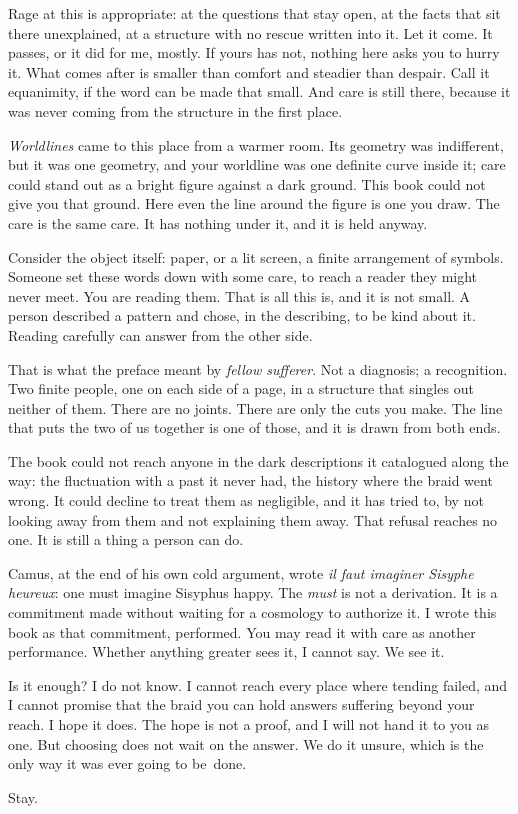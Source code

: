 Rage at this is appropriate: at the questions that stay open, at the facts that sit there unexplained, at a structure with no rescue written into it. Let it come. It passes, or it did for me, mostly. If yours has not, nothing here asks you to hurry it. What comes after is smaller than comfort and steadier than despair. Call it equanimity, if the word can be made that small. And care is still there, because it was never coming from the structure in the first place.

\textit{Worldlines} came to this place from a warmer room. Its geometry was indifferent, but it was one geometry, and your worldline was one definite curve inside it; care could stand out as a bright figure against a dark ground. This book could not give you that ground. Here even the line around the figure is one you draw. The care is the same care. It has nothing under it, and it is held anyway.

Consider the object itself: paper, or a lit screen, a finite arrangement of symbols. Someone set these words down with some care, to reach a reader they might never meet. You are reading them. That is all this is, and it is not small. A person described a pattern and chose, in the describing, to be kind about it. Reading carefully can answer from the other side.

That is what the preface meant by \emph{fellow sufferer}. Not a diagnosis; a recognition. Two finite people, one on each side of a page, in a structure that singles out neither of them. There are no joints. There are only the cuts you make. The line that puts the two of us together is one of those, and it is drawn from both ends.

The book could not reach anyone in the dark descriptions it catalogued along the way: the fluctuation with a past it never had, the history where the braid went wrong. It could decline to treat them as negligible, and it has tried to, by not looking away from them and not explaining them away. That refusal reaches no one. It is still a thing a person can do.

Camus, at the end of his own cold argument, wrote \emph{il faut imaginer Sisyphe heureux}: one must imagine Sisyphus happy. The \emph{must} is not a derivation. It is a commitment made without waiting for a cosmology to authorize it. I wrote this book as that commitment, performed. You may read it with care as another performance. Whether anything greater sees it, I cannot say. We see it.

Is it enough? I do not know. I cannot reach every place where tending failed, and I cannot promise that the braid you can hold answers suffering beyond your reach. I hope it does. The hope is not a proof, and I will not hand it to you as one. But choosing does not wait on the answer. We do it unsure, which is the only way it was ever going to be~done.

\vspace{1.2em}
\noindent Stay.
